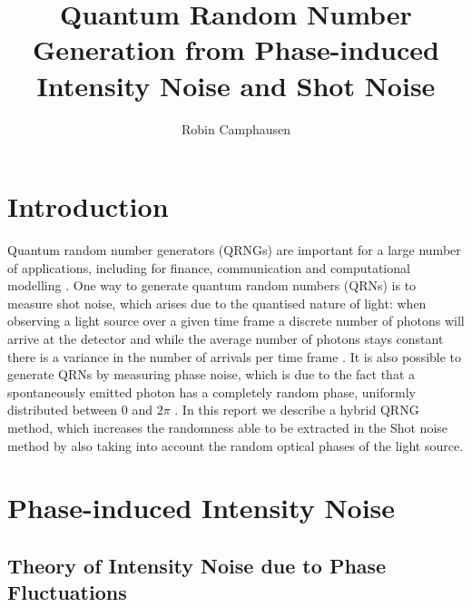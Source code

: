 \documentclass[]{article}
\title{Quantum Random Number Generation from Phase-induced Intensity Noise and Shot Noise}
\author{Robin Camphausen}
\date{}
\begin{document}
\maketitle
\section{Introduction}

	Quantum random number generators (QRNGs) are important for a large number of applications, including for finance, communication and computational modelling \cite{herrero-collantes_quantum_2017}. One way to generate quantum random numbers (QRNs) is to measure shot noise, which arises due to the quantised nature of light: when observing a light source over a given time frame a discrete number of photons will arrive at the detector and while the average number of photons stays constant there is a variance in the number of arrivals per time frame \cite{sanguinetti_quantum_2014}. It is also possible to generate QRNs by measuring phase noise, which is due to the fact that a spontaneously emitted photon has a completely random phase, uniformly distributed between $0$ and $2\pi$ \cite{xu_ultrafast_2012,abellan_ultra-fast_2014}. In this report we describe a hybrid QRNG method, which increases the randomness able to be extracted in the Shot noise method by also taking into account the random optical phases of the light source.

\section{Phase-induced Intensity Noise} 
\subsection{Theory of Intensity Noise due to Phase Fluctuations}\label{RPS}
\end{document}
